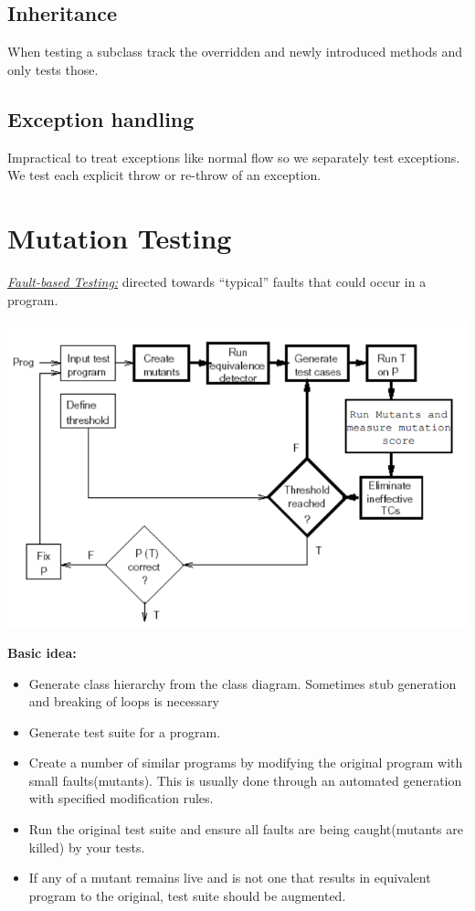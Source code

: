 \documentclass{article}
\begin{document}
\subsection{Inheritance}

When testing a subclass track the overridden and newly introduced methods and only tests those.

\subsection{Exception handling}

Impractical to treat exceptions like normal flow so we separately test exceptions. We test each explicit throw or re-throw of an exception.

\vfill

\section{Mutation Testing}
\textit{\underline{Fault-based Testing:}} directed towards “typical” faults that could occur in a program.

\includegraphics[scale=0.7]{mutation_testing}

\textbf{Basic idea:}
\begin{itemize}
 \item Generate class hierarchy from the class diagram. Sometimes stub generation and breaking of loops is necessary
  \item Generate test suite for a program.
  \item Create a number of similar programs by modifying the original program with small faults(mutants). This is usually done through an automated generation with specified modification rules.
  \item  Run the original test suite and ensure all faults are being caught(mutants are killed) by your tests.
    \item  If any of a mutant remains live and is not one that results in equivalent program to the original, test suite should be augmented.
\end{itemize}
\end{document}
